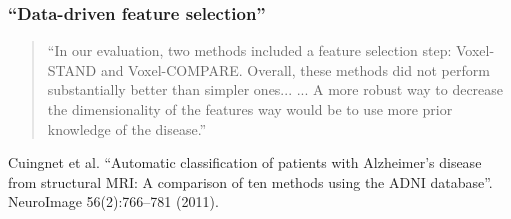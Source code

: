 


\begin{frame}
\frametitle{``Data-driven feature selection''}
\begin{quote}
``In our evaluation, two methods included a feature selection step: Voxel-STAND and Voxel-COMPARE.
Overall, these methods did not perform substantially better than simpler ones... ...
A more robust way to decrease the dimensionality of the features way would be to use more prior knowledge of the disease.''


\end{quote}

\begin{center}
\begin{tiny}
Cuingnet et al. ``Automatic classification of patients with Alzheimer's disease from structural MRI: A comparison of ten methods using the ADNI database''.  NeuroImage 56(2):766--781 (2011).\par
\end{tiny}
\end{center}
\end{frame}




